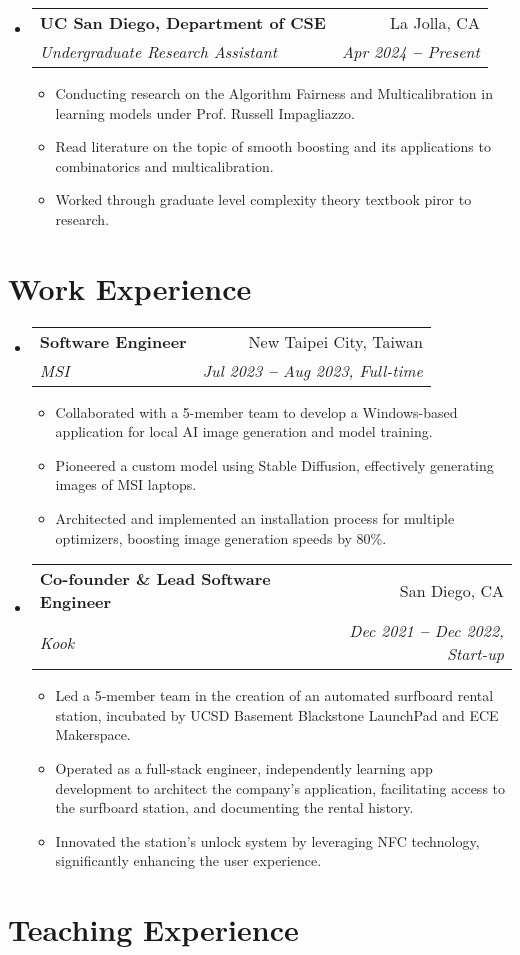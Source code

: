 \documentclass[letterpaper,11pt]{article}
\makeatletter
\newcommand{\resumeItem}[1]{
  \item\small{
    {#1 \vspace{-1pt}}
  }
}
\newcommand{\resumeSubheading}[4]{
  \vspace{-2pt}\item
    \begin{tabular*}{0.97\textwidth}[t]{l@{\extracolsep{\fill}}r}
      \textbf{#1} & #2 \\
      \textit{\small#3} & \textit{\small #4} \\
    \end{tabular*}\vspace{-2pt}
}
\newcommand{\resumeSubHeadingListStart}{\begin{itemize}[leftmargin=0.15in, label={}]}
\newcommand{\resumeSubHeadingListEnd}{\end{itemize}}
\newcommand{\resumeItemListStart}{\begin{itemize}}
\newcommand{\resumeItemListEnd}{\end{itemize}\vspace{-7pt}}
\makeatother
\begin{document}
  \resumeSubHeadingListStart
    \resumeSubheading
      {UC San Diego, Department of CSE}{La Jolla, CA}
      {Undergraduate Research Assistant}{Apr 2024 \textbf{--} Present}
        \resumeItemListStart
    \resumeItem{Conducting research on the Algorithm Fairness and Multicalibration in learning models under Prof. Russell Impagliazzo.}
        \resumeItem{Read literature on the topic of smooth boosting and its applications to combinatorics and multicalibration.}
        \resumeItem{Worked through graduate level complexity theory textbook piror to research.}
        \resumeItemListEnd
  \resumeSubHeadingListEnd


\section{Work Experience}
  \vspace{5pt}
  \resumeSubHeadingListStart

    \resumeSubheading
      {Software Engineer}{New Taipei City, Taiwan}
      {MSI}{Jul 2023 \textbf{--} Aug 2023, Full-time}
      \resumeItemListStart
          \resumeItem{Collaborated with a 5-member team to develop a Windows-based application for local AI image generation and model training.}
          \resumeItem{Pioneered a custom model using Stable Diffusion, effectively generating images of MSI laptops.}
          \resumeItem{Architected and implemented an installation process for multiple optimizers, boosting image generation speeds by 80\%.}
      \resumeItemListEnd

    \resumeSubheading
      {Co-founder \& Lead Software Engineer}{San Diego, CA}
      {Kook}{Dec 2021 \textbf{--} Dec 2022, Start-up}
      \resumeItemListStart
          \resumeItem{Led a 5-member team in the creation of an automated surfboard rental station, incubated by UCSD Basement Blackstone LaunchPad and ECE Makerspace.}
          \resumeItem{Operated as a full-stack engineer, independently learning app development to architect the company's application, facilitating access to the surfboard station, and documenting the rental history.}
          \resumeItem{Innovated the station's unlock system by leveraging NFC technology, significantly enhancing the user experience.}
      \resumeItemListEnd

  \resumeSubHeadingListEnd

\section{Teaching Experience}
\end{document}
